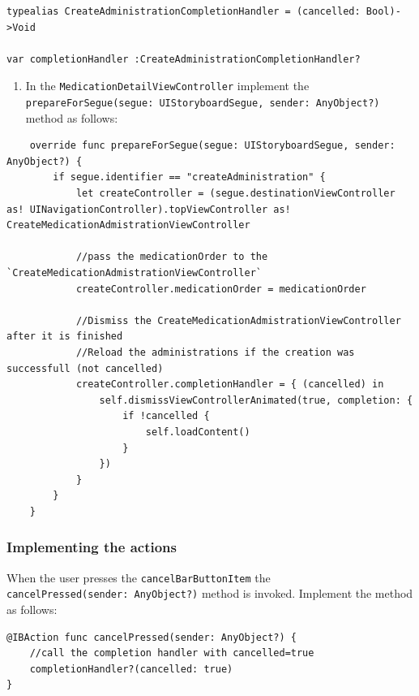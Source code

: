 \documentclass{article}
\begin{document}
\begin{verbatim}
typealias CreateAdministrationCompletionHandler = (cancelled: Bool)->Void

var completionHandler :CreateAdministrationCompletionHandler?
\end{verbatim}

\begin{enumerate}
\def\labelenumi{\arabic{enumi}.}
\setcounter{enumi}{2}
\item
  In the \texttt{MedicationDetailViewController} implement the
  \texttt{prepareForSegue(segue:\ UIStoryboardSegue,\ sender:\ AnyObject?)}
  method as follows:
\end{enumerate}

\begin{verbatim}
    override func prepareForSegue(segue: UIStoryboardSegue, sender: AnyObject?) {
        if segue.identifier == "createAdministration" {
            let createController = (segue.destinationViewController as! UINavigationController).topViewController as! CreateMedicationAdmistrationViewController

            //pass the medicationOrder to the `CreateMedicationAdmistrationViewController`
            createController.medicationOrder = medicationOrder

            //Dismiss the CreateMedicationAdmistrationViewController after it is finished
            //Reload the administrations if the creation was successfull (not cancelled)
            createController.completionHandler = { (cancelled) in
                self.dismissViewControllerAnimated(true, completion: {
                    if !cancelled {
                        self.loadContent()
                    }
                })
            }
        }
    }
\end{verbatim}

\subsubsection{Implementing the actions}\label{implementing-actions}

When the user presses the \texttt{cancelBarButtonItem} the
\texttt{cancelPressed(sender:\ AnyObject?)} method is invoked. Implement
the method as follows:

\begin{verbatim}
@IBAction func cancelPressed(sender: AnyObject?) {
    //call the completion handler with cancelled=true
    completionHandler?(cancelled: true)
}
\end{verbatim}
\end{document}
